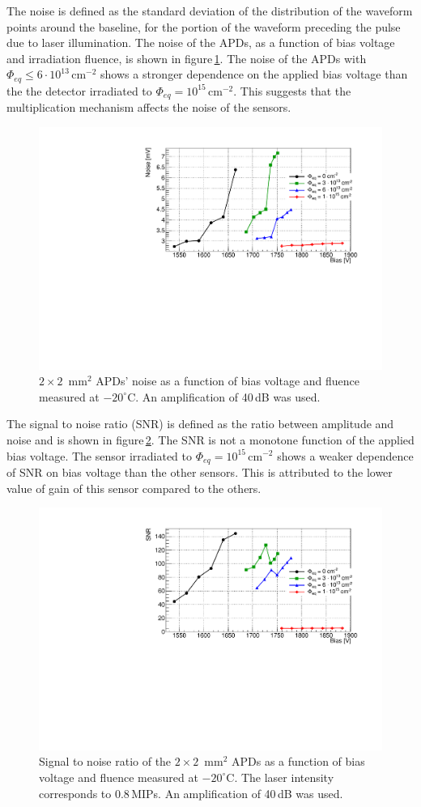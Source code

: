 \documentclass{article}
\begin{document}
The noise is defined as the standard deviation of the distribution of the waveform points around the baseline, for the portion of the waveform preceding the pulse due to laser illumination.
The noise of the APDs, as a function of bias voltage and irradiation fluence, is shown in figure\,\ref{fig:noise2x2}.
The noise of the APDs with $\Phi_{eq} \leq 6 \cdot 10^{13}$\,cm$^{-2}$ shows a stronger dependence on the applied bias voltage than the the detector irradiated to $\Phi_{eq} = 10^{15}$\,cm$^{-2}$.
This suggests that the multiplication mechanism affects the noise of the sensors.

\begin{figure}
  \centering
  \includegraphics[width = 0.6 \textwidth]{noise2x2APDs}
  \caption{$2 \times 2$~mm$^2$ APDs' noise as a function of bias voltage and fluence measured at $-20^\circ$C. An amplification of 40\,dB was used.}
  \label{fig:noise2x2}
\end{figure}

The signal to noise ratio (SNR) is defined as the ratio between amplitude and noise and is shown in figure\,\ref{fig:snr2x2}.
The SNR is not a monotone function of the applied bias voltage.
The sensor irradiated to $\Phi_{eq} = 10^{15}$\,cm$^{-2}$ shows a weaker dependence of SNR on bias voltage than the other sensors.
This is attributed to the lower value of gain of this sensor compared to the others.

\begin{figure}
  \centering
  \includegraphics[width = 0.6 \textwidth]{snr2x2APDs}
  \caption{Signal to noise ratio of the $2 \times 2$~mm$^2$ APDs as a function of bias voltage and fluence measured at $-20^\circ$C. The laser intensity corresponds to 0.8\,MIPs. An amplification of 40\,dB was used.}
  \label{fig:snr2x2}
\end{figure}
\end{document}
